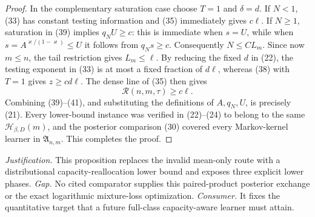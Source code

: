 \documentclass{article}
\begin{document}
\begin{proof}
In the complementary saturation case choose \(T=1\) and \(\delta=d\).  If \(N<1\), (33) has constant testing information and (35) immediately gives \(c\ell\).  If \(N\geq1\), saturation in (39) implies \(q_NU\geq c\): this is immediate when \(s=U\), while when \(s=A^{\varkappa/(1-\varkappa)}\leq U\) it follows from \(q_Ns\geq c\).  Consequently \(N\leq C L_m\).  Since now \(m\leq n\), the tail restriction gives \(L_m\leq\ell\).  By reducing the fixed \(d\) in (22), the testing exponent in (33) is at most a fixed fraction of \(d\ell\), whereas (38) with \(T=1\) gives \(z\geq c d\ell\).  The dense line of (35) then gives
\[
\mathcal R(n,m,\tau)\geq c\ell.                                   \tag{41}
\]
Combining (39)--(41), and substituting the definitions of \(A,q_N,U\), is precisely (21).  Every lower-bound instance was verified in (22)--(24) to belong to the same \(\mathcal H_{\beta,D}(m)\), and the posterior comparison (30) covered every Markov-kernel learner in \(\mathfrak A_{n,m}\).  This completes the proof.
\end{proof}
\par\smallskip\noindent \textit{Justification.} This proposition replaces the invalid mean-only route with a distributional capacity-reallocation lower bound and exposes three explicit lower phases. \textit{Gap.} No cited comparator supplies this paired-product posterior exchange or the exact logarithmic mixture-loss optimization. \textit{Consumer.} It fixes the quantitative target that a future full-class capacity-aware learner must attain.
\end{document}
